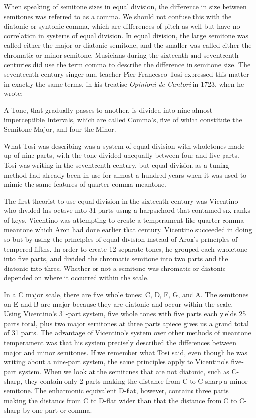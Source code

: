 When speaking of semitone sizes in equal division, the difference in size between semitones was
referred to as a comma.  We should not confuse this with the diatonic or syntonic
comma, which are differences of pitch as well but have no correlation in systems
of equal division.  In equal division, the large semitone was called either the major or
diatonic semitone, and the smaller was called either the chromatic or minor semitone.
Musicians during the sixteenth and seventeenth centuries did use the term comma to describe
the difference in semitone size.  The seventeenth-century singer and teacher Pier Francesco
Tosi expressed this matter in exactly the same terms, in his treatise \textit{Opinioni de
Cantori} in 1723, when he wrote:
\begin{blocks}
A Tone, that gradually passes to another, is divided into nine almost imperceptible Intervals,
which are called Comma's, five of which constitute the Semitone Major, and four the Minor.
\autocite[20]{PFT:1}
\end{blocks}
What Tosi was describing was a system of equal division with wholetones made up of
nine parts, with the tone divided unequally between four and five parts.  Tosi was writing in
the seventeenth century, but equal division as a tuning method had already been in use for
almost a hundred years when it was used to mimic the same features of quarter-comma meantone.

The first theorist to use equal division in the sixteenth century was Vicentino who
divided his octave into 31 parts using a harpsichord that contained six ranks of keys.
Vicentino was attempting to create a temperament like quarter-comma meantone which Aron had done
earlier that century.  Vicentino succeeded in doing so but
by using the principles of equal division instead of Aron's principles of tempered fifths. In order
to create 12 separate tones, he grouped each wholetone into five parts, and
divided the chromatic semitone into two parts and the diatonic into three.  Whether or not a
semitone was chromatic or diatonic depended on where it occurred within the scale.

In a C major scale, there are five whole tones: C, D, F, G, and A.  The semitones
on E and B are major because they are diatonic and occur within the scale.
Using Vicentino's 31-part system, five whole tones with
five parts each yields 25 parts total, plus two major semitones at three parts apiece gives
us a grand total of 31 parts.  The advantage of Vicentino's system over other
methods of meantone temperament was that his system precisely described the differences
between major and minor semitones.  If we remember what Tosi said, even though he was
writing about a nine-part system, the same principles apply to Vicentino's five-part system.
When we look at the semitones that are not
diatonic, such as C-sharp, they contain only 2 parts making the distance from
C to C-sharp a minor semitone.  The enharmonic equivalent D-flat, however,
contains three parts making the distance from C to D-flat wider than that the distance
from C to C-sharp by one part or comma.

